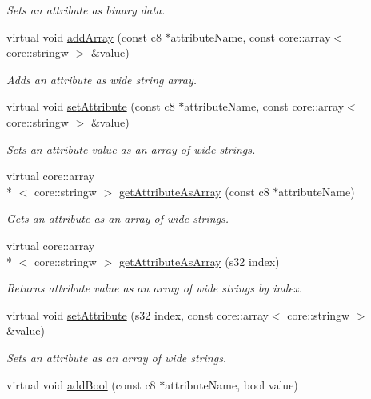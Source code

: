 \begin{DoxyCompactItemize}
\begin{DoxyCompactList}\small\item\em Sets an attribute as binary data. \end{DoxyCompactList}\item 
virtual void \hyperlink{classirr_1_1io_1_1_c_attributes_aef7dbf080e484c787f4b4850f84a26d2}{add\-Array} (const c8 $\ast$attribute\-Name, const core\-::array$<$ core\-::stringw $>$ \&value)
\begin{DoxyCompactList}\small\item\em Adds an attribute as wide string array. \end{DoxyCompactList}\item 
virtual void \hyperlink{classirr_1_1io_1_1_c_attributes_a9e71f0c4b6dbc67e62305df2cb29dce4}{set\-Attribute} (const c8 $\ast$attribute\-Name, const core\-::array$<$ core\-::stringw $>$ \&value)
\begin{DoxyCompactList}\small\item\em Sets an attribute value as an array of wide strings. \end{DoxyCompactList}\item 
virtual core\-::array\\*
$<$ core\-::stringw $>$ \hyperlink{classirr_1_1io_1_1_c_attributes_a1f495d069f2e11ee45afcbc9d51d84a3}{get\-Attribute\-As\-Array} (const c8 $\ast$attribute\-Name)
\begin{DoxyCompactList}\small\item\em Gets an attribute as an array of wide strings. \end{DoxyCompactList}\item 
virtual core\-::array\\*
$<$ core\-::stringw $>$ \hyperlink{classirr_1_1io_1_1_c_attributes_ac48b3af8f02372323d555251260c877d}{get\-Attribute\-As\-Array} (s32 index)
\begin{DoxyCompactList}\small\item\em Returns attribute value as an array of wide strings by index. \end{DoxyCompactList}\item 
\hypertarget{classirr_1_1io_1_1_c_attributes_a456b94e50cb31044ad1895dd2e806818}{virtual void \hyperlink{classirr_1_1io_1_1_c_attributes_a456b94e50cb31044ad1895dd2e806818}{set\-Attribute} (s32 index, const core\-::array$<$ core\-::stringw $>$ \&value)}\label{classirr_1_1io_1_1_c_attributes_a456b94e50cb31044ad1895dd2e806818}

\begin{DoxyCompactList}\small\item\em Sets an attribute as an array of wide strings. \end{DoxyCompactList}\item 
\hypertarget{classirr_1_1io_1_1_c_attributes_a93144d2cdf5f19a00a6eae0721b50662}{virtual void \hyperlink{classirr_1_1io_1_1_c_attributes_a93144d2cdf5f19a00a6eae0721b50662}{add\-Bool} (const c8 $\ast$attribute\-Name, bool value)}\label{classirr_1_1io_1_1_c_attributes_a93144d2cdf5f19a00a6eae0721b50662}


\end{DoxyCompactItemize}
